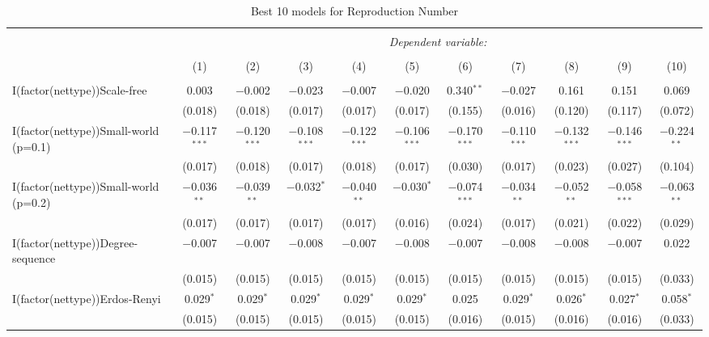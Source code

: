 
\begin{table}[!htbp] \centering 
  \caption{Best 10 models for Reproduction Number} 
  \label{tab:best_models_rep_num} 
\begin{tabular}{@{\extracolsep{5pt}}lcccccccccc} 
\\[-1.8ex]\hline 
\hline \\[-1.8ex] 
 & \multicolumn{10}{c}{\textit{Dependent variable:}} \\ 
\cline{2-11} 
\\[-1.8ex] & (1) & (2) & (3) & (4) & (5) & (6) & (7) & (8) & (9) & (10)\\ 
\hline \\[-1.8ex] 
 I(factor(nettype))Scale-free & 0.003 & $-$0.002 & $-$0.023 & $-$0.007 & $-$0.020 & 0.340$^{**}$ & $-$0.027 & 0.161 & 0.151 & 0.069 \\ 
  & (0.018) & (0.018) & (0.017) & (0.017) & (0.017) & (0.155) & (0.016) & (0.120) & (0.117) & (0.072) \\ 
  I(factor(nettype))Small-world (p=0.1) & $-$0.117$^{***}$ & $-$0.120$^{***}$ & $-$0.108$^{***}$ & $-$0.122$^{***}$ & $-$0.106$^{***}$ & $-$0.170$^{***}$ & $-$0.110$^{***}$ & $-$0.132$^{***}$ & $-$0.146$^{***}$ & $-$0.224$^{**}$ \\ 
  & (0.017) & (0.018) & (0.017) & (0.018) & (0.017) & (0.030) & (0.017) & (0.023) & (0.027) & (0.104) \\ 
  I(factor(nettype))Small-world (p=0.2) & $-$0.036$^{**}$ & $-$0.039$^{**}$ & $-$0.032$^{*}$ & $-$0.040$^{**}$ & $-$0.030$^{*}$ & $-$0.074$^{***}$ & $-$0.034$^{**}$ & $-$0.052$^{**}$ & $-$0.058$^{***}$ & $-$0.063$^{**}$ \\ 
  & (0.017) & (0.017) & (0.017) & (0.017) & (0.016) & (0.024) & (0.017) & (0.021) & (0.022) & (0.029) \\ 
  I(factor(nettype))Degree-sequence & $-$0.007 & $-$0.007 & $-$0.008 & $-$0.007 & $-$0.008 & $-$0.007 & $-$0.008 & $-$0.008 & $-$0.007 & 0.022 \\ 
  & (0.015) & (0.015) & (0.015) & (0.015) & (0.015) & (0.015) & (0.015) & (0.015) & (0.015) & (0.033) \\ 
  I(factor(nettype))Erdos-Renyi & 0.029$^{*}$ & 0.029$^{*}$ & 0.029$^{*}$ & 0.029$^{*}$ & 0.029$^{*}$ & 0.025 & 0.029$^{*}$ & 0.026$^{*}$ & 0.027$^{*}$ & 0.058$^{*}$ \\ 
  & (0.015) & (0.015) & (0.015) & (0.015) & (0.015) & (0.016) & (0.015) & (0.016) & (0.016) & (0.033) \\ 

\end{tabular}
\end{table}
